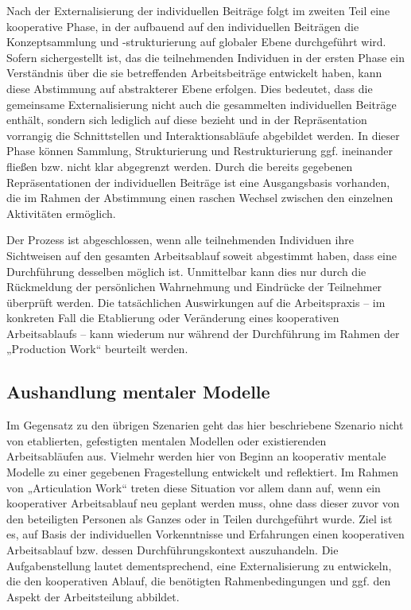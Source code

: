 Nach der Externalisierung der individuellen Beiträge folgt im zweiten Teil eine kooperative Phase, in der aufbauend auf den individuellen Beiträgen die Konzeptsammlung und -strukturierung auf globaler Ebene durchgeführt wird. Sofern sichergestellt ist, das die teilnehmenden Individuen in der ersten Phase ein Verständnis über die sie betreffenden Arbeitsbeiträge entwickelt haben, kann diese Abstimmung auf abstrakterer Ebene erfolgen. Dies bedeutet, dass die gemeinsame Externalisierung nicht auch die gesammelten individuellen Beiträge enthält, sondern sich lediglich auf diese bezieht und in der Repräsentation vorrangig die Schnittstellen und Interaktionsabläufe abgebildet werden. In dieser Phase können Sammlung, Strukturierung und Restrukturierung ggf. ineinander fließen bzw. nicht klar abgegrenzt werden. Durch die bereits gegebenen Repräsentationen der individuellen Beiträge ist eine Ausgangsbasis vorhanden, die im Rahmen der Abstimmung einen raschen Wechsel zwischen den einzelnen Aktivitäten ermöglich.

Der Prozess ist abgeschlossen, wenn alle teilnehmenden Individuen ihre Sichtweisen auf den gesamten Arbeitsablauf soweit abgestimmt haben, dass eine Durchführung desselben möglich ist. Unmittelbar kann dies nur durch die Rückmeldung der persönlichen Wahrnehmung und Eindrücke der Teilnehmer überprüft werden. Die tatsächlichen Auswirkungen auf die Arbeitspraxis -- im konkreten Fall die Etablierung oder Veränderung eines kooperativen Arbeitsablaufs -- kann wiederum nur während der Durchführung im Rahmen der „Production Work“ beurteilt werden.


\subsection{Aushandlung mentaler Modelle} %
\label{sub:aushandlung_individueller_mentaler_modelle}

Im Gegensatz zu den übrigen Szenarien geht das hier beschriebene Szenario nicht von etablierten, gefestigten mentalen Modellen oder existierenden Arbeitsabläufen aus. Vielmehr werden hier von Beginn an kooperativ mentale Modelle zu einer gegebenen Fragestellung entwickelt und reflektiert. Im Rahmen von „Articulation Work“ treten diese Situation vor allem dann auf, wenn ein kooperativer Arbeitsablauf neu geplant werden muss, ohne dass dieser zuvor von den beteiligten Personen als Ganzes oder in Teilen durchgeführt wurde. Ziel ist es, auf Basis der individuellen Vorkenntnisse und Erfahrungen einen kooperativen Arbeitsablauf bzw. dessen Durchführungskontext auszuhandeln. Die Aufgabenstellung lautet dementsprechend, eine Externalisierung zu entwickeln, die den kooperativen Ablauf, die benötigten Rahmenbedingungen und ggf. den Aspekt der Arbeitsteilung abbildet. 

